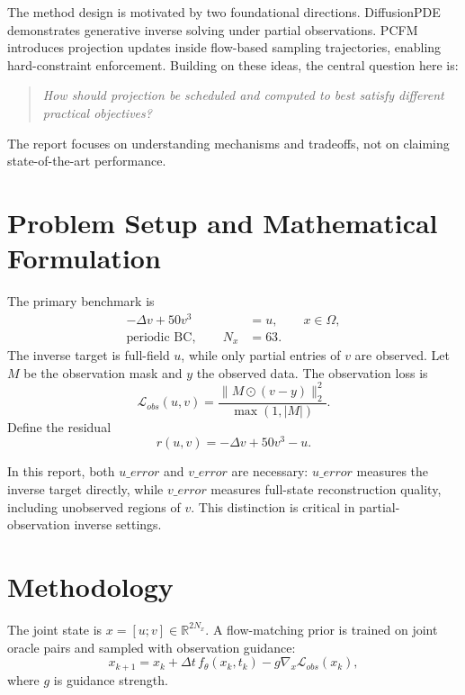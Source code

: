 \documentclass[10pt,twocolumn]{article}
\begin{document}
The method design is motivated by two foundational directions. DiffusionPDE \cite{diffusionpde} demonstrates generative inverse solving under partial observations. PCFM \cite{pcfm} introduces projection updates inside flow-based sampling trajectories, enabling hard-constraint enforcement. Building on these ideas, the central question here is:
\begin{quote}
\emph{How should projection be scheduled and computed to best satisfy different practical objectives?}
\end{quote}

The report focuses on understanding mechanisms and tradeoffs, not on claiming state-of-the-art performance.

\section{Problem Setup and Mathematical Formulation}
The primary benchmark is
\begin{equation}
\begin{aligned}
-\Delta v + 50v^3 &= u,\qquad x\in\Omega,\\
\text{periodic BC},\qquad N_x&=63.
\end{aligned}
\end{equation}
The inverse target is full-field \(u\), while only partial entries of \(v\) are observed. Let \(M\) be the observation mask and \(y\) the observed data. The observation loss is
\begin{equation}
\mathcal{L}_{obs}(u,v)=\frac{\|M\odot(v-y)\|_2^2}{\max(1,|M|)}.
\end{equation}
Define the residual
\begin{equation}
r(u,v)=-\Delta v+50v^3-u.
\end{equation}

In this report, both \(u\_error\) and \(v\_error\) are necessary: \(u\_error\) measures the inverse target directly, while \(v\_error\) measures full-state reconstruction quality, including unobserved regions of \(v\). This distinction is critical in partial-observation inverse settings.

\section{Methodology}
The joint state is \(x=[u;v]\in\mathbb{R}^{2N_x}\). A flow-matching prior \cite{flowmatching} is trained on joint oracle pairs and sampled with observation guidance:
\begin{equation}
x_{k+1}=x_k+\Delta t\,f_\theta(x_k,t_k)-g\nabla_x\mathcal{L}_{obs}(x_k),
\end{equation}
where \(g\) is guidance strength.
\end{document}
